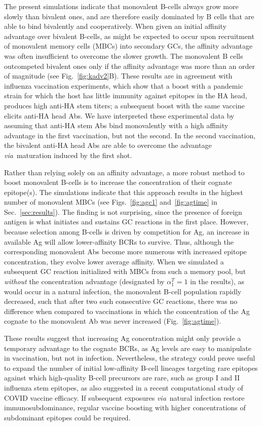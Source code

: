 \documentclass[utf8]{frontiersHLTH}%
\newcommand{\cred}[1]{#1} %
\def\via {{\it via}}
\newcommand{\fig}[1]{Fig.~\ref{fig:#1}}
\newcommand{\figs}[2]{Figs.~\ref{fig:#1} and~\ref{fig:#2}}
\newcommand{\Sec}[1]{Sec.~\ref{sec:#1}}
\renewcommand{\sec}[1]{\Sec{#1}}
\begin{document}
The present simulations indicate that monovalent B-cells always
grow more slowly than bivalent ones, and are therefore easily dominated by B cells that are able to bind bivalently and
cooperatively. When given an initial affinity advantage over bivalent
B-cells, as might be expected to occur upon recruitment of monovalent memory
cells (MBCs) into secondary GCs, the affinity advantage was often
insufficient to overcome the slower growth.
The monovalent B cells outcompeted bivalent ones only if the
affinity advantage was more than an order of magnitude (see \fig{kadv2}B). These
results are in agreement with influenza vaccination experiments, which show
that a boost with a pandemic strain for which the host has little
immunity against epitopes in the HA head, produces high anti-HA stem
titers; a subsequent boost with the same vaccine elicits anti-HA head
Abs.\cite{ellebedy14} We have interpreted these experimental data by assuming 
that anti-HA stem Abs bind monovalently with
a high affinity advantage in the first vaccination, but not the second.
In the second vaccination, the bivalent anti-HA head 
Abs are able to overcome the advantage \via~maturation induced by the first shot.

Rather than relying solely on an affinity advantage, a more robust method
to boost monovalent B-cells is to increase the concentration of their cognate
epitope(s). The simulations indicate that this approach results in the highest
number of monovalent MBCs (see \figs{agc1}{agtime} in \sec{results}).
The finding is not surprising, since the presence of foreign
antigen is what initiates and sustains GC reactions in the first place.
However, because selection among B-cells is driven by competition for Ag, an
increase in available Ag will allow lower-affinity BCRs to survive.
Thus, although the corresponding monovalent Abs become more numerous with increased epitope concentration,
they evolve lower average affinity.
When we simulated a subsequent
GC reaction initialized with MBCs from such a memory pool, but
\textit{without} the concentration advantage (designated by $\alpha_1^T=1$ in
the results), as would occur in a
natural infection, the monovalent B-cell population rapidly decreased,
such that after two such consecutive GC reactions, there was no difference
when compared to vaccinations in which the concentration of the Ag
cognate to the monovalent Ab was never increased (\fig{agtime}).

These results suggest
that increasing Ag concentration might only provide a temporary advantage
to the cognate BCRs, as Ag levels are easy to manipulate in
vaccination, but not in infection. \cred{Nevertheless, the strategy could prove
useful to expand the number of initial low-affinity B-cell lineages
targeting rare epitopes against which high-quality B-cell precursors are
rare, such as group I and II influenza stem epitopes, as also suggested 
in a recent computational study of COVID vaccine efficacy.\cite{garg21}}
%
If subsequent
exposures \via~natural infection restore immunosubdominance,\cite{ellebedy14} regular
vaccine boosting with higher concentrations of subdominant epitopes could be
required.
\end{document}
